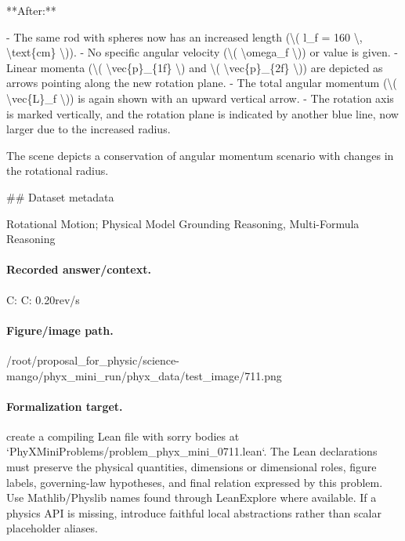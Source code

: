 **After:**

- The same rod with spheres now has an increased length (\textbackslash{}( l\_f = 160 \textbackslash{}, \textbackslash{}text\{cm\} \textbackslash{})).
- No specific angular velocity (\textbackslash{}( \textbackslash{}omega\_f \textbackslash{})) or value is given.
- Linear momenta (\textbackslash{}( \textbackslash{}vec\{p\}\_\{1f\} \textbackslash{}) and \textbackslash{}( \textbackslash{}vec\{p\}\_\{2f\} \textbackslash{})) are depicted as arrows pointing along the new rotation plane.
- The total angular momentum (\textbackslash{}( \textbackslash{}vec\{L\}\_f \textbackslash{})) is again shown with an upward vertical arrow.
- The rotation axis is marked vertically, and the rotation plane is indicated by another blue line, now larger due to the increased radius. 

The scene depicts a conservation of angular momentum scenario with changes in the rotational radius.

\#\# Dataset metadata

Rotational Motion; Physical Model Grounding Reasoning, Multi-Formula Reasoning

\paragraph{Recorded answer/context.}
C: C: 0.20rev/s

\paragraph{Figure/image path.}
/root/proposal\_for\_physic/science-mango/phyx\_mini\_run/phyx\_data/test\_image/711.png

\paragraph{Formalization target.}
create a compiling Lean file with sorry bodies at `PhyXMiniProblems/problem\_phyx\_mini\_0711.lean`. The Lean declarations must preserve the physical quantities, dimensions or dimensional roles, figure labels, governing-law hypotheses, and final relation expressed by this problem.
Use Mathlib/Physlib names found through LeanExplore where available. If a physics API is missing, introduce faithful local abstractions rather than scalar placeholder aliases.

